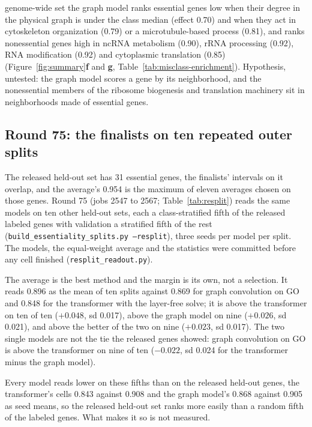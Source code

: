 \begin{description}
    genome-wide set the graph model ranks essential genes low when their degree in the
    physical graph is under the class median (effect 0.70) and when they act in
    cytoskeleton organization (0.79) or a microtubule-based process (0.81), and ranks
    nonessential genes high in ncRNA metabolism (0.90), rRNA processing (0.92), RNA
    modification (0.92) and cytoplasmic translation (0.85)
    (Figure~\ref{fig:summary}\textbf{f} and \textbf{g},
    Table~\ref{tab:misclass-enrichment}). Hypothesis, untested: the graph model scores
    a gene by its neighborhood, and the nonessential members of the ribosome biogenesis
    and translation machinery sit in neighborhoods made of essential genes.
\end{description}



\subsection{Round 75: the finalists on ten repeated outer splits}
\label{sec:round75}

The released held-out set has 31 essential genes, the finalists' intervals on it overlap,
and the average's 0.954 is the maximum of eleven averages chosen on those genes. Round 75
(jobs 2547 to 2567; Table~\ref{tab:resplit}) reads the same models on ten other held-out
sets, each a class-stratified fifth of the released labeled genes with validation a
stratified fifth of the rest (\texttt{build\_essentiality\_splits.py --resplit}), three
seeds per model per split. The models, the equal-weight average and the statistics were
committed before any cell finished (\texttt{resplit\_readout.py}).



The average is the best method and the margin is its own, not a selection. It reads 0.896
as the mean of ten splits against 0.869 for graph convolution on GO and 0.848 for the
transformer with the layer-free solve; it is above the transformer on ten of ten
($+0.048$, sd 0.017), above the graph model on nine ($+0.026$, sd 0.021), and above the
better of the two on nine ($+0.023$, sd 0.017). The two single models are not the tie the
released genes showed: graph convolution on GO is above the transformer on nine of ten
($-0.022$, sd 0.024 for the transformer minus the graph model).

Every model reads lower on these fifths than on the released held-out genes, the
transformer's cells 0.843 against 0.908 and the graph model's 0.868 against 0.905 as seed
means, so the
released held-out set ranks more easily than a random fifth of the labeled genes. What
makes it so is not measured.

